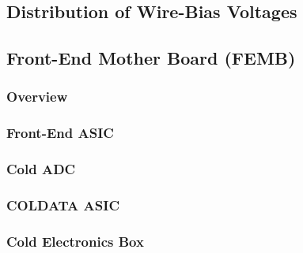 \subsection{Distribution of Wire-Bias Voltages}
\label{sec:fdsp-tpc-elec-design-bias}


\subsection{Front-End Mother Board (FEMB)}
\label{sec:fdsp-tpc-elec-design-femb}


\subsubsection{Overview}
\label{sec:fdsp-tpc-elec-design-femb-ov}


\subsubsection{Front-End ASIC}
\label{sec:fdsp-tpc-elec-design-femb-fe}


\subsubsection{Cold ADC}
\label{sec:fdsp-tpc-elec-design-femb-adc}


\subsubsection{COLDATA ASIC}
\label{sec:fdsp-tpc-elec-design-femb-coldata}


\subsubsection{Cold Electronics Box}
\label{sec:fdsp-tpc-elec-design-femb-box}


